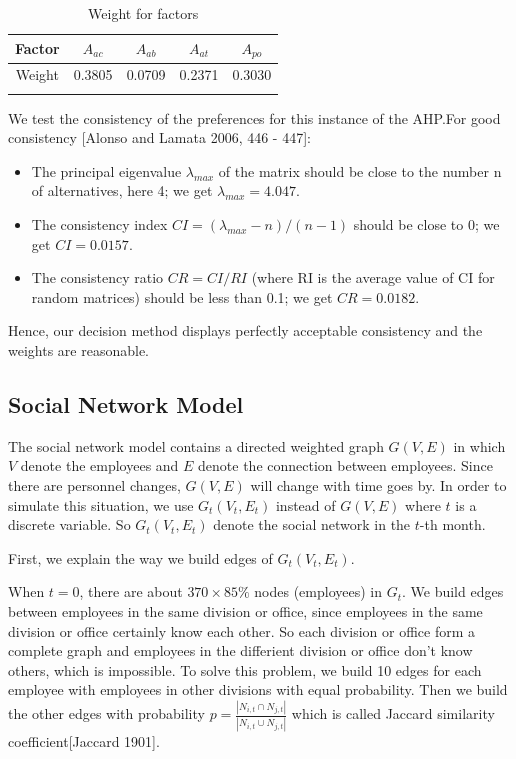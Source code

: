 \documentclass[12pt,a4paper,titlepage]{article}
\begin{document}
\begin{table}
\begin{center}
\begin{tabular}{ccccc} \toprule{}
  Factor  &$A_{ac}$    &$A_{ab}$   &$A_{at}$    &$A_{po}$\\ \midrule{}
  Weight  &0.3805  &0.0709  &0.2371  &0.3030\\ \bottomrule{}
\end{tabular}
\end{center}
\caption{Weight for factors}\label{weight}
\end{table}

We test the consistency of the preferences for this instance of the
AHP.\@ For good consistency [Alonso and Lamata 2006, 446 - 447]:

\begin{itemize}
\item The principal eigenvalue $\lambda_{max}$ of the matrix should be
  close to the number n of alternatives, here 4; we get $\lambda_{max} = 4.047$.
\item The consistency index $CI = (\lambda_{max}-n)/(n-1)$ should be close to 0; we get $CI = 0.0157$.
\item The consistency ratio $CR = CI/RI$ (where RI is the average
  value of CI for random matrices) should be less than 0.1; we get $CR
  = 0.0182$.
\end{itemize}

Hence, our decision method displays perfectly acceptable consistency
and the weights are reasonable.

\subsection{Social Network Model}
\label{sec:social-network-model}

The social network model contains a directed weighted graph $G(V,E)$
in which $V$ denote the employees and $E$ denote the connection
between employees. Since there are personnel changes, $G(V,E)$ will
change with time goes by. In order to simulate this situation, we use
$G_t(V_t,E_t)$ instead of $G(V,E)$ where $t$ is a discrete
variable. So $G_t(V_t,E_t)$ denote the social network in the $t$-th
month.

First, we explain the way we build edges of $G_t(V_t,E_t)$.

When $t = 0$, there are about $370 \times 85\%$ nodes (employees) in
$G_t$. We build edges between employees in the same division or
office, since employees in the same division or office certainly know
each other. So each division or office form a complete graph and
employees in the differient division or office don't know others,
which is impossible. To solve this problem, we build 10 edges for each
employee with employees in other divisions with equal
probability. Then we build the other edges with probability
$p = \frac{\left|N_{i,t} \cap N_{j,t}\right|}{\left|N_{i,t} \cup
    N_{j,t}\right|}$
which is called Jaccard similarity coefficient[Jaccard 1901].
\end{document}
